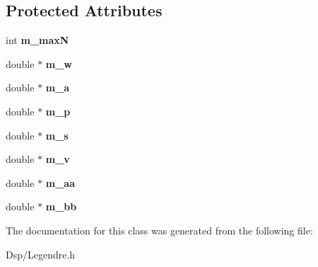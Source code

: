\subsection*{Protected Attributes}
\begin{DoxyCompactItemize}
\item 
\hypertarget{classDsp_1_1Legendre_1_1PolynomialFinderBase_a91ce0381b1bc6391a85edcb4d469256a}{int {\bfseries m\-\_\-max\-N}}\label{classDsp_1_1Legendre_1_1PolynomialFinderBase_a91ce0381b1bc6391a85edcb4d469256a}

\item 
\hypertarget{classDsp_1_1Legendre_1_1PolynomialFinderBase_a4eb786569d62c48c461074e3cfebb3d8}{double $\ast$ {\bfseries m\-\_\-w}}\label{classDsp_1_1Legendre_1_1PolynomialFinderBase_a4eb786569d62c48c461074e3cfebb3d8}

\item 
\hypertarget{classDsp_1_1Legendre_1_1PolynomialFinderBase_ad05805e08ffc0ffac4aac99a5cc7c651}{double $\ast$ {\bfseries m\-\_\-a}}\label{classDsp_1_1Legendre_1_1PolynomialFinderBase_ad05805e08ffc0ffac4aac99a5cc7c651}

\item 
\hypertarget{classDsp_1_1Legendre_1_1PolynomialFinderBase_a1fa04d3d2ee8104f5d7d76a25a6e2e40}{double $\ast$ {\bfseries m\-\_\-p}}\label{classDsp_1_1Legendre_1_1PolynomialFinderBase_a1fa04d3d2ee8104f5d7d76a25a6e2e40}

\item 
\hypertarget{classDsp_1_1Legendre_1_1PolynomialFinderBase_a59ed3550308a4a1b29fafd4492cfe173}{double $\ast$ {\bfseries m\-\_\-s}}\label{classDsp_1_1Legendre_1_1PolynomialFinderBase_a59ed3550308a4a1b29fafd4492cfe173}

\item 
\hypertarget{classDsp_1_1Legendre_1_1PolynomialFinderBase_a9b0949262c09ab334fc60ee9509ba845}{double $\ast$ {\bfseries m\-\_\-v}}\label{classDsp_1_1Legendre_1_1PolynomialFinderBase_a9b0949262c09ab334fc60ee9509ba845}

\item 
\hypertarget{classDsp_1_1Legendre_1_1PolynomialFinderBase_a56aecc45af2f207196d5432b25ccf881}{double $\ast$ {\bfseries m\-\_\-aa}}\label{classDsp_1_1Legendre_1_1PolynomialFinderBase_a56aecc45af2f207196d5432b25ccf881}

\item 
\hypertarget{classDsp_1_1Legendre_1_1PolynomialFinderBase_ad9c20006fc8232dbc5adb7ce8dc97a3c}{double $\ast$ {\bfseries m\-\_\-bb}}\label{classDsp_1_1Legendre_1_1PolynomialFinderBase_ad9c20006fc8232dbc5adb7ce8dc97a3c}

\end{DoxyCompactItemize}


The documentation for this class was generated from the following file\-:\begin{DoxyCompactItemize}
\item 
Dsp/Legendre.\-h\end{DoxyCompactItemize}
